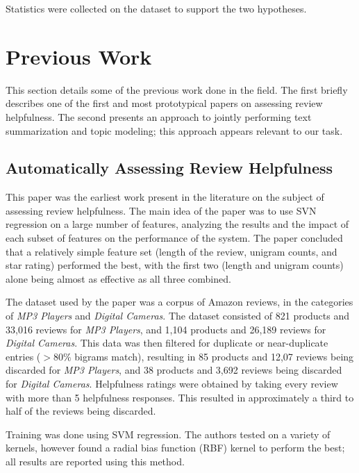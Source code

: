 \documentclass[12pt,letterpaper]{article}
\begin{document}
Statistics were collected on the dataset to support the two hypotheses.




\section{Previous Work}
This section details some of the previous work done in the field.
The first briefly describes one of the first and most prototypical papers
	on assessing review helpfulness.
The second presents an approach to jointly performing text summarization
	and topic modeling; this approach appears relevant to our task.

\subsection{Automatically Assessing Review Helpfulness \cite{2006kim-helpfulness}}
This paper was the earliest work present in the literature on the subject of assessing review helpfulness.
The main idea of the paper was to use SVN regression on a large number of features,
	analyzing the results and the impact of each subset of features on the performance
	of the system.
The paper concluded that a relatively simple feature set (length of the review,
	unigram counts, and star rating) performed the best, with the first two
	(length and unigram counts) alone being almost as effective as all three
	combined.

The dataset used by the paper was a corpus of Amazon reviews, in the categories
	of {\em MP3 Players} and {\em Digital Cameras}.
The dataset consisted of 821 products and 33,016 reviews for {\em MP3 Players},
	and 1,104 products and 26,189 reviews for {\em Digital Cameras}.
This data was then filtered for duplicate or near-duplicate entries ($>80\%$ bigrams match),
	resulting in 85 products and 12,07 reviews being discarded for {\em MP3 Players},
	and 38 products and 3,692 reviews being discarded for {\em Digital Cameras}.
Helpfulness ratings were obtained by taking every review with more than 5 helpfulness
	responses.
This resulted in approximately a third to half of the reviews being discarded.

Training was done using SVM regression.
The authors tested on a variety of kernels, however found a radial bias function (RBF)
	kernel to perform the best; all results are reported using this method.
\end{document}
